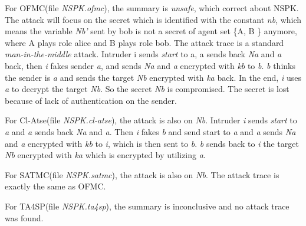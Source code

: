 \documentclass[a4paper, 12pt]{report}
\begin{document}
        For OFMC(file \emph{NSPK.ofmc}), the summary is \emph{unsafe}, which correct about NSPK. The attack will focus on the secret which is identified with the constant \emph{nb}, which means the variable \emph{Nb'} sent by bob is not a secret of agent set \{A, B \} anymore, where A plays role alice and B plays role bob. The attack trace is a standard \emph{man-in-the-middle} attack. Intruder i sends \emph{start} to a, a sends back \emph{Na} and \emph{a} back, then
        \emph{i} fakes sender \emph{a}, and sends \emph{Na} and \emph{a} encrypted with \emph{kb} to \emph{b}. \emph{b} thinks the sender is \emph{a} and sends the target \emph{Nb} encrypted with \emph{ka} back. In the end, \emph{i} uses \emph{a} to decrypt the target \emph{Nb}. So the secret \emph{Nb} is compromised. The secret is lost because of lack of authentication on the sender.
            
        For Cl-Atse(file \emph{NSPK.cl-atse}), the attack is also on \emph{Nb}. Intruder \emph{i} sends \emph{start} to \emph{a} and \emph{a} sends back \emph{Na} and \emph{a}. Then \emph{i} fakes \emph{b} and send start to \emph{a} and \emph{a} sends \emph{Na} and \emph{a} encrypted with \emph{kb} to \emph{i}, which is then sent to \emph{b}. \emph{b} sends back to \emph{i} the target \emph{Nb} encrypted with \emph{ka} which is encrypted by utilizing \emph{a}.
            
        For SATMC(file \emph{NSPK.satmc}), the attack is also on \emph{Nb}. The attack trace is exactly the same as OFMC.
            
        For TA4SP(file \emph{NSPK.ta4sp}), the summary is inconclusive and no attack trace was found.
\end{document}
